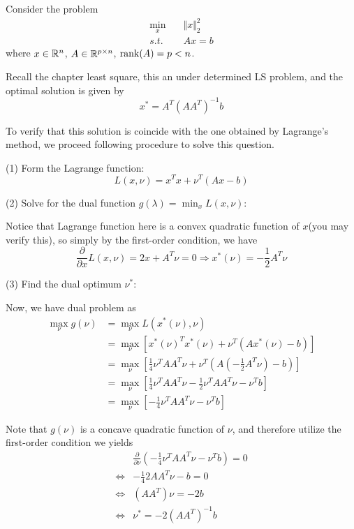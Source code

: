 \begin{example}
	Consider the problem
	\begin{align*}
		\min_x \quad &\Vert x \Vert_2^2\\
		s.t.\quad &Ax = b
	\end{align*}
	where $x\in\mathbb{R}^n$, $A\in\mathbb{R}^{p\times n}$, $\operatorname{rank}(A) = p< n$.
	
	Recall the chapter least square, this an under determined LS problem, and the optimal solution is given by 
	$$x^* = A^T(AA^T)^{-1}b$$
	
	To verify that this solution is coincide with the one obtained by Lagrange's method, we proceed following procedure to solve this question.
	
	(1) Form the Lagrange function:
	 $$L(x, \nu) = x^Tx + \nu^T(Ax - b)$$
	
	(2) Solve for the dual function $g(\lambda) = \min_x L(x, \nu)$:
		
		Notice that Lagrange function here is a convex quadratic function of $x$(you may verify this), so simply by the first-order condition, we have
		$$\frac{\partial}{\partial x} L(x, \nu) = 2x+A^T\nu = 0\Rightarrow x^*(\nu) = -\frac{1}{2}A^T\nu$$

	(3) Find the dual optimum $\nu^*$:
	
	Now, we have dual problem as
	\begin{align*}
		\max_{\nu} g(\nu) &= \max_{\nu} L(x^*(\nu), \nu)\\
		&= \max_{\nu}[x^*(\nu)^Tx^*(\nu) + \nu^T(Ax^*(\nu) - b)]\\
		&= \max_{\nu}[\frac{1}{4}\nu^TAA^T\nu + \nu^T(A(-\frac{1}{2}A^T\nu)-b)]\\
		&= \max_{\nu}[\frac{1}{4}\nu^TAA^T\nu - \frac{1}{2}\nu^TAA^T\nu - \nu^Tb]\\
		&= \max_{\nu}[-\frac{1}{4}\nu^TAA^T\nu - \nu^Tb]
	\end{align*}
	
	Note that $g(\nu)$ is a concave quadratic function of $\nu$, and therefore utilize the first-order condition we yields
	\begin{align*}
	&\frac{\partial}{\partial \nu}(-\frac{1}{4}\nu^TAA^T\nu - \nu^Tb)= 0\\
	\Leftrightarrow&-\frac{1}{4} 2AA^T\nu - b = 0\\
	\Leftrightarrow& (AA^T)\nu = -2b\\
	\Leftrightarrow& \nu^* = -2(AA^T)^{-1}b
	\end{align*}


\end{example}
